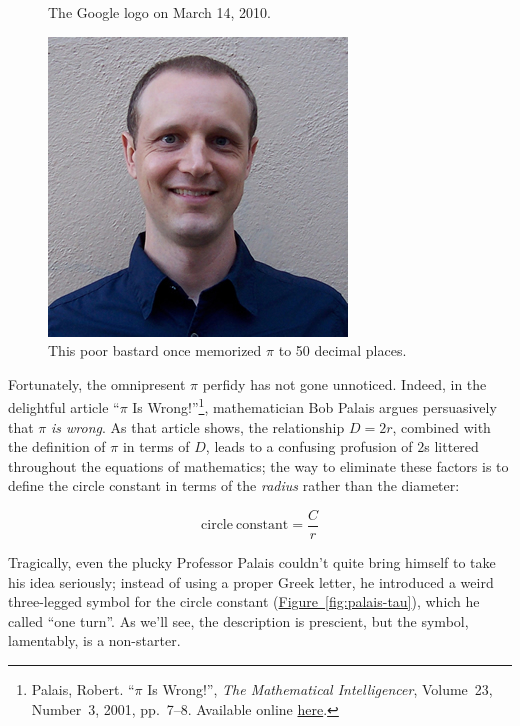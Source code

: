 \documentclass{article}
\begin{document}
\begin{figure}
\begin{center}
\end{center}
\caption{The Google logo on March 14, 2010.\label{fig:google-pi-day}}
\end{figure}

\begin{figure}
\begin{center}
\includegraphics{images/figures/michael_hartl.jpg}
\end{center}
\caption{This poor bastard once memorized $\pi$ to 50 decimal places.\label{fig:michael_hartl}}
\end{figure}

Fortunately, the omnipresent $\pi$ perfidy has not gone unnoticed. Indeed, in the delightful article ``$\pi$ Is Wrong!''\footnote{Palais, Robert. ``$\pi$ Is Wrong!'', \emph{The Mathematical Intelligencer}, Volume~23, Number~3, 2001, pp.~7--8. Available online \href{http://www.math.utah.edu/~palais/pi.html}{here}.}, mathematician Bob Palais argues persuasively that $\pi$ \emph{is wrong}. As that article shows, the relationship $D = 2r$, combined with the definition of $\pi$ in terms of $D$, leads to a confusing profusion of $2$s littered throughout the equations of mathematics; the way to eliminate these factors is to define the circle constant in terms of the \emph{radius} rather than the diameter:

\[
  \mathrm{circle\ constant} = \frac{C}{r}
\]

\noindent Tragically, even the plucky Professor Palais couldn't quite bring himself to take his idea seriously; instead of using a proper Greek letter, he introduced a weird three-legged symbol for the circle constant (\hyperref[fig:palais-tau]{Figure~}\ref{fig:palais-tau}), which he called ``one turn''. As we'll see, the description is prescient, but the symbol, lamentably, is a non-starter.
\end{document}
